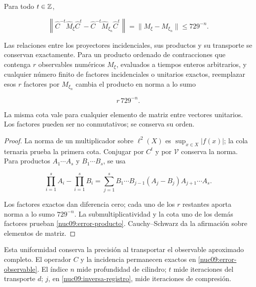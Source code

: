 \begin{theorem}
\label{nuc09:precision}
Para todo \(t\in\mathbb Z\),



\begin{equation}
\boxed{
\left\|\widehat C^{-t}\widehat M_\xi\widehat C^t
-\widehat C^{-t}\widehat M_{\xi_n}\widehat C^t\right\|
=\|M_\xi-M_{\xi_n}\|\le729^{-n}.}
\label{nuc09:error-observable}
\end{equation}



Las relaciones entre los proyectores incidenciales, sus productos
y su transporte se conservan exactamente.
Para un producto ordenado de contracciones que contenga \(r\)
observables numéricos \(M_\xi\), evaluados a tiempos enteros
arbitrarios, y cualquier número finito de factores incidenciales
o unitarios exactos, reemplazar esos \(r\) factores por
\(M_{\xi_n}\) cambia el producto en norma a lo sumo



\begin{equation}
\boxed{r\,729^{-n}.}
\label{nuc09:error-producto}
\end{equation}



La misma cota vale para cualquier elemento de matriz entre vectores
unitarios. Los factores pueden ser no conmutativos; se conserva su orden.
\end{theorem}

\begin{proof}
La norma de un multiplicador sobre \(\ell^2(X)\) es
\(\sup_{x\in X}|f(x)|\); la cola ternaria prueba la primera cota.
Conjugar por \(C^t\) y por \(\mathcal V\) conserva la norma.
Para productos \(A_1\cdots A_s\) y \(B_1\cdots B_s\), se usa



\[
\prod_{i=1}^s A_i-\prod_{i=1}^s B_i
=\sum_{j=1}^s B_1\cdots B_{j-1}(A_j-B_j)A_{j+1}\cdots A_s.
\]



Los factores exactos dan diferencia cero; cada uno de los \(r\)
restantes aporta norma a lo sumo \(729^{-n}\).
La submultiplicatividad y la cota uno de los demás factores prueban
\eqref{nuc09:error-producto}.
Cauchy--Schwarz da la afirmación sobre elementos de matriz.
\end{proof}

Esta uniformidad conserva la precisión al transportar el observable
aproximado completo. El operador \(C\) y la incidencia permanecen
exactos en \eqref{nuc09:error-observable}.
El índice \(n\) mide profundidad de cilindro; \(t\) mide iteraciones
del transporte \(d\); \(j\), en \eqref{nuc09:inversa-registro},
mide iteraciones de compresión.

